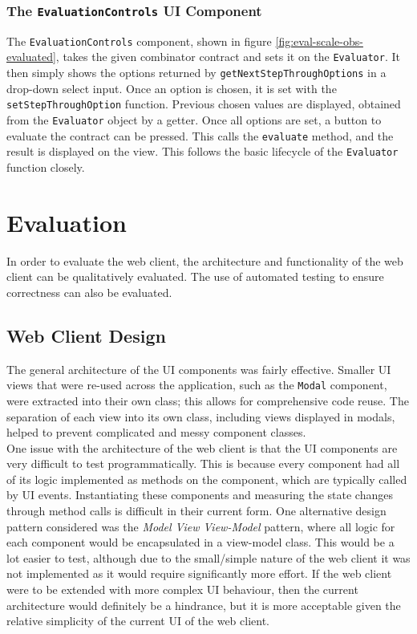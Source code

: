 \subsubsection{The \texttt{EvaluationControls} UI Component}

The \texttt{EvaluationControls} component, shown in figure \ref{fig:eval-scale-obs-evaluated}, takes the given combinator contract and sets it on the \texttt{Evaluator}. It then simply shows the options returned by \texttt{getNextStepThroughOptions} in a drop-down select input. Once an option is chosen, it is set with the \texttt{setStepThroughOption} function. Previous chosen values are displayed, obtained from the \texttt{Evaluator} object by a getter. Once all options are set, a button to evaluate the contract can be pressed. This calls the \texttt{evaluate} method, and the result is displayed on the view. This follows the basic lifecycle of the \texttt{Evaluator} function closely.


\section{Evaluation} \label{web-client-eval}

In order to evaluate the web client, the architecture and functionality of the web client can be qualitatively evaluated. The use of automated testing to ensure correctness can also be evaluated.


\subsection{Web Client Design}

The general architecture of the UI components was fairly effective. Smaller UI views that were re-used across the application, such as the \texttt{Modal} component, were extracted into their own class; this allows for comprehensive code reuse. The separation of each view into its own class, including views displayed in modals, helped to prevent complicated and messy component classes. \\

One issue with the architecture of the web client is that the UI components are very difficult to test programmatically. This is because every component had all of its logic implemented as methods on the component, which are typically called by UI events. Instantiating these components and measuring the state changes through method calls is difficult in their current form. One alternative design pattern considered was the \textit{Model View View-Model} pattern, where all logic for each component would be encapsulated in a view-model class. This would be a lot easier to test, although due to the small/simple nature of the web client it was not implemented as it would require significantly more effort. If the web client were to be extended with more complex UI behaviour, then the current architecture would definitely be a hindrance, but it is more acceptable given the relative simplicity of the current UI of the web client. \\

